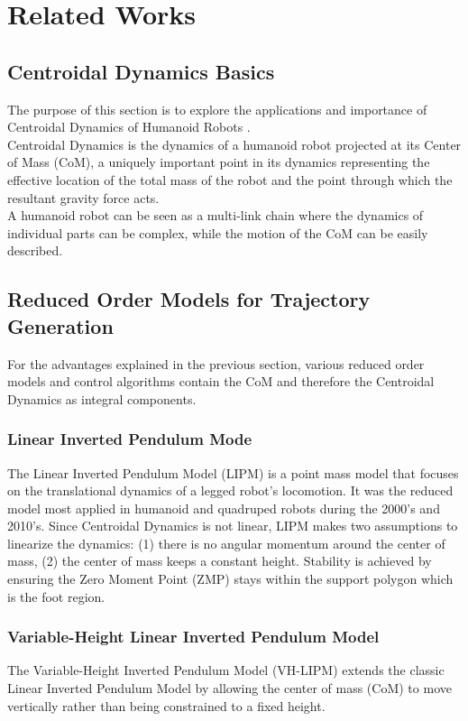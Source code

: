 \documentclass[main.tex]{subfiles}
\begin{document}
\section{Related Works}\label{sec:relatedworks}

\subsection{Centroidal Dynamics Basics}

The purpose of this section is to explore the applications and importance of Centroidal Dynamics of Humanoid Robots \cite{CD}. 
\\Centroidal Dynamics is the dynamics of a humanoid robot projected at its Center of Mass (CoM), a uniquely important point in its dynamics representing the effective location of the total mass of the robot and the point through which the resultant gravity force acts. 
\\A humanoid robot can be seen as a multi-link chain where the dynamics of individual parts can be complex, while the motion of the CoM can be easily described. 

\subsection{Reduced Order Models for Trajectory Generation}
\label{sec:rom}
For the advantages explained in the previous section, various reduced order models and control algorithms contain the CoM and therefore the Centroidal Dynamics as integral components. 

\subsubsection{Linear Inverted Pendulum Mode}
The Linear Inverted Pendulum Model (LIPM) \cite{LIPM} is a point mass model that focuses on the translational dynamics of a legged robot's locomotion. It was the reduced model most applied in humanoid and quadruped robots during the 2000's and 2010's.
Since Centroidal Dynamics is not linear, LIPM makes two assumptions to linearize the dynamics: (1) there is no angular momentum around the center of mass, (2) the center of mass keeps a constant height.
Stability is achieved by ensuring the Zero Moment Point (ZMP) stays within the support polygon which is the foot region.

\subsubsection{Variable-Height Linear Inverted Pendulum Model}
The Variable-Height Inverted Pendulum Model (VH-LIPM) \cite{VHLIPM} extends the classic Linear Inverted Pendulum Model by allowing the center of mass (CoM) to move vertically rather than being constrained to a fixed height.
\end{document}
